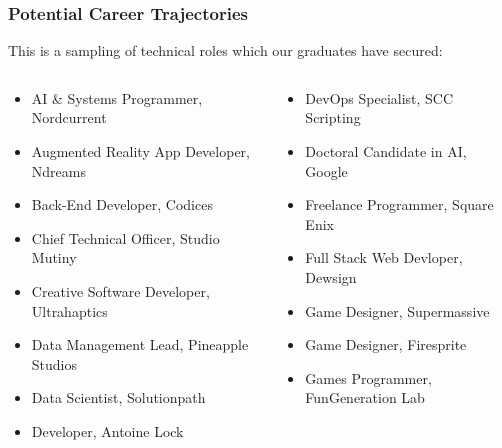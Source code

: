 \begin{frame}
	\frametitle{Potential Career Trajectories}
	
	This is a sampling of technical roles which our graduates have secured:
	
	\begin{columns}
		\begin{column}{0.5\textwidth}
			\begin{itemize}
				\item AI \& Systems Programmer, Nordcurrent
				\item Augmented Reality App Developer, Ndreams
				\item Back-End Developer, Codices
				\item Chief Technical Officer, Studio Mutiny
				\item Creative Software Developer, Ultrahaptics
				\item Data Management Lead, Pineapple Studios
				\item Data Scientist, Solutionpath
				\item Developer, Antoine Lock
			\end{itemize}
		\end{column}
		\begin{column}{0.5\textwidth}
			\begin{itemize}
				\item DevOps Specialist, SCC Scripting
				\item Doctoral Candidate in AI, Google
				\item Freelance Programmer, Square Enix
				\item Full Stack Web Devloper, Dewsign
				\item Game Designer, Supermassive
				\item Game Designer, Firesprite
				\item Games Programmer, FunGeneration Lab
			\end{itemize}
		\end{column}
	\end{columns}
\end{frame}

